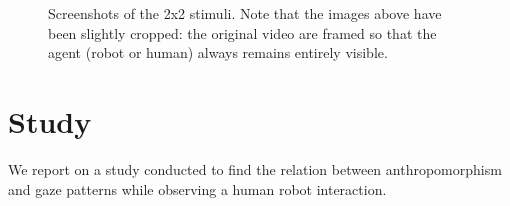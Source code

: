 \documentclass[a4,twocolumn,10pt]{article}
\begin{document}
\begin{figure}
    \centering



    \caption{\small Screenshots of the 2x2 stimuli. Note that the images above have been
    slightly cropped: the original video are framed so that the agent (robot or
    human) always remains entirely visible.}
    \label{fig:stimuli}
\end{figure}




\section{Study}

We report on a study conducted to find the relation between anthropomorphism and
gaze patterns while observing a human robot interaction.
\end{document}
